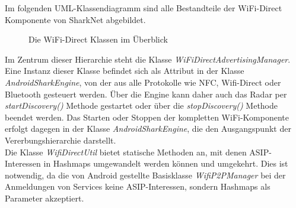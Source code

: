 Im folgenden UML-Klassendiagramm sind alle Bestandteile der WiFi-Direct Komponente von SharkNet abgebildet.
\begin{figure}[H]
	\centering
	\hspace*{1cm}
	\caption{Die WiFi-Direct Klassen im Überblick}
	\label{fig:wifiAll}
\end{figure}
Im Zentrum dieser Hierarchie steht die Klasse \textit{WiFiDirectAdvertisingManager}. Eine Instanz dieser Klasse befindet sich als Attribut in der Klasse \textit{AndroidSharkEngine}, von der aus alle Protokolle wie NFC, Wifi-Direct oder Bluetooth gesteuert werden. Über die Engine kann daher auch das Radar per \textit{startDiscovery()} Methode gestartet oder über die \textit{stopDiscovery()} Methode beendet werden. Das Starten oder Stoppen der kompletten WiFi-Komponente erfolgt dagegen in der Klasse \textit{AndroidSharkEngine}, die den Ausgangspunkt der Vererbungshierarchie darstellt.
\\Die Klasse \textit{WifiDirectUtil} bietet statische Methoden an, mit denen ASIP-Interessen in Hashmaps umgewandelt werden können und umgekehrt. Dies ist notwendig, da die von Android gestellte Basisklasse \textit{WifiP2PManager} bei der Anmeldungen von Services keine ASIP-Interessen, sondern Hashmaps als Parameter akzeptiert.

